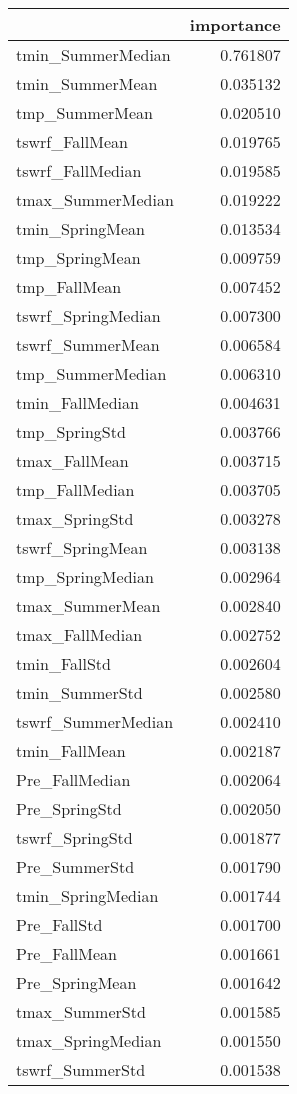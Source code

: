 \begin{tabular}{lr}
\toprule
 & importance \\
\midrule
tmin_SummerMedian & 0.761807 \\
tmin_SummerMean & 0.035132 \\
tmp_SummerMean & 0.020510 \\
tswrf_FallMean & 0.019765 \\
tswrf_FallMedian & 0.019585 \\
tmax_SummerMedian & 0.019222 \\
tmin_SpringMean & 0.013534 \\
tmp_SpringMean & 0.009759 \\
tmp_FallMean & 0.007452 \\
tswrf_SpringMedian & 0.007300 \\
tswrf_SummerMean & 0.006584 \\
tmp_SummerMedian & 0.006310 \\
tmin_FallMedian & 0.004631 \\
tmp_SpringStd & 0.003766 \\
tmax_FallMean & 0.003715 \\
tmp_FallMedian & 0.003705 \\
tmax_SpringStd & 0.003278 \\
tswrf_SpringMean & 0.003138 \\
tmp_SpringMedian & 0.002964 \\
tmax_SummerMean & 0.002840 \\
tmax_FallMedian & 0.002752 \\
tmin_FallStd & 0.002604 \\
tmin_SummerStd & 0.002580 \\
tswrf_SummerMedian & 0.002410 \\
tmin_FallMean & 0.002187 \\
Pre_FallMedian & 0.002064 \\
Pre_SpringStd & 0.002050 \\
tswrf_SpringStd & 0.001877 \\
Pre_SummerStd & 0.001790 \\
tmin_SpringMedian & 0.001744 \\
Pre_FallStd & 0.001700 \\
Pre_FallMean & 0.001661 \\
Pre_SpringMean & 0.001642 \\
tmax_SummerStd & 0.001585 \\
tmax_SpringMedian & 0.001550 \\
tswrf_SummerStd & 0.001538 \\

\end{tabular}
